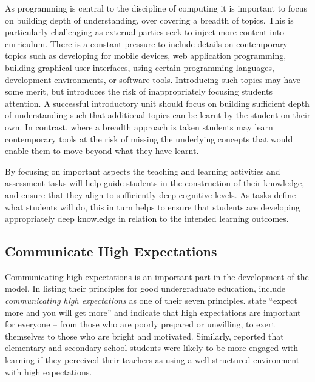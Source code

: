 As programming is central to the discipline of computing \cite{McGettrick:2005} it is important to focus on building depth of understanding, over covering a breadth of topics. This is particularly challenging as external parties seek to inject more content into curriculum. There is a constant pressure to include details on contemporary topics such as developing for mobile devices, web application programming, building graphical user interfaces, using certain programming languages, development environments, or software tools. Introducing such topics may have some merit, but introduces the risk of inappropriately focusing students attention. A successful introductory unit should focus on building sufficient depth of understanding such that additional topics can be learnt by the student on their own. In contrast, where a breadth approach is taken students may learn contemporary tools at the risk of missing the underlying concepts that would enable them to move beyond what they have learnt.

By focusing on important aspects the teaching and learning activities and assessment tasks will help guide students in the construction of their knowledge, and ensure that they align to sufficiently deep cognitive levels. As tasks define what students will do, this in turn helps to ensure that students are developing appropriately deep knowledge in relation to the intended learning outcomes.


\subsection{Communicate High Expectations} %
\label{ssub:have_high_expectations_of_students_}

Communicating high expectations is an important part in the development of the model. In listing their principles for good undergraduate education, \citet{Chickering:1987} include \emph{communicating high expectations} as one of their seven principles. \citet{Chickering:1987} state ``expect more and you will get more'' and indicate that high expectations are important for everyone -- from those who are poorly prepared or unwilling, to exert themselves to those who are bright and motivated. Similarly, \citet{Klem:2004} reported that elementary and secondary school students were likely to be more engaged with learning if they perceived their teachers as using a well structured environment with high expectations. 

